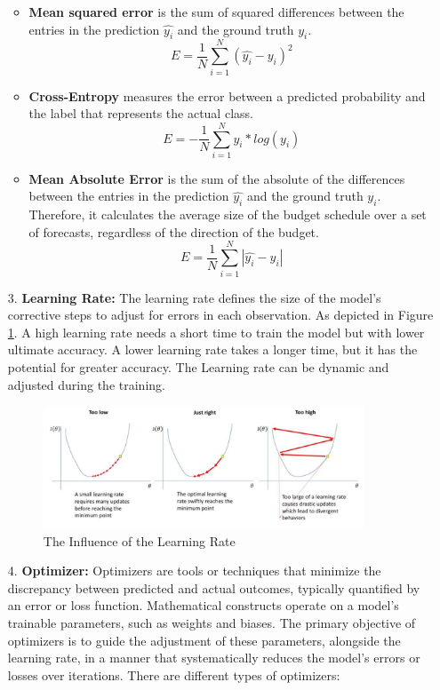 \documentclass[english,version-2022-01]{uzl-thesis}
\begin{document}
\begin{itemize}
    \begin{itemize}
    \label{cross}
       \item \textbf{Mean squared error} is the sum of squared differences between the entries in the prediction $\widehat{y_{i}}$ and the ground truth $y_{i}$.
       $$E=\frac{1}{N}\sum_{i=1}^{N}(\widehat{y_{i}}-y_{i})^{2}$$
       \item \textbf{Cross-Entropy} measures the error between a predicted probability and the label that represents the actual class.
       $$E=-\frac{1}{N}\sum_{i=1}^{N}\widehat{y_{i}}*log(y_{i})$$
       \item \textbf{Mean Absolute Error} is the sum of the absolute of the differences between the entries in the prediction $\widehat{y_{i}}$ and the ground truth $y_{i}$. Therefore, it calculates the average size of the budget schedule over a set of forecasts, regardless of the direction of the budget.
        $$E=\frac{1}{N}\sum_{i=1}^{N}|\widehat{y_{i}}-y_{i}|$$
    \end{itemize}
    \newpage
    \item[3.] \textbf{Learning Rate:} The learning rate defines the size of the model's corrective steps to adjust for errors in each observation.\cite{10.1007/s00779-021-01587-4} As depicted in Figure \ref{learningRate}. A high learning rate needs a short time to train the model but with lower ultimate accuracy. A lower learning rate takes a longer time, but it has the potential for greater accuracy. The Learning rate can be dynamic and adjusted during the training.
    \begin{figure}[htpb]
       \centering
       \includegraphics[width=0.9\textwidth]{pic/Learn rate.png}
       \caption{The Influence of the Learning Rate\cite{learningRate}}
       \label{learningRate}
    \end{figure}
    \item[4.] \textbf{Optimizer:} Optimizers are tools or techniques that minimize the discrepancy between predicted and actual outcomes, typically quantified by an error or loss function. Mathematical constructs operate on a model's trainable parameters, such as weights and biases. The primary objective of optimizers is to guide the adjustment of these parameters, alongside the learning rate, in a manner that systematically reduces the model's errors or losses over iterations.\cite{sun2020optimization} There are different types of optimizers:\\

\end{itemize}
\end{document}
